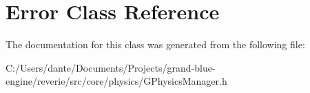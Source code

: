 \hypertarget{class_error}{}\section{Error Class Reference}
\label{class_error}


The documentation for this class was generated from the following file\+:\begin{DoxyCompactItemize}
\item 
C\+:/\+Users/dante/\+Documents/\+Projects/grand-\/blue-\/engine/reverie/src/core/physics/G\+Physics\+Manager.\+h\end{DoxyCompactItemize}
